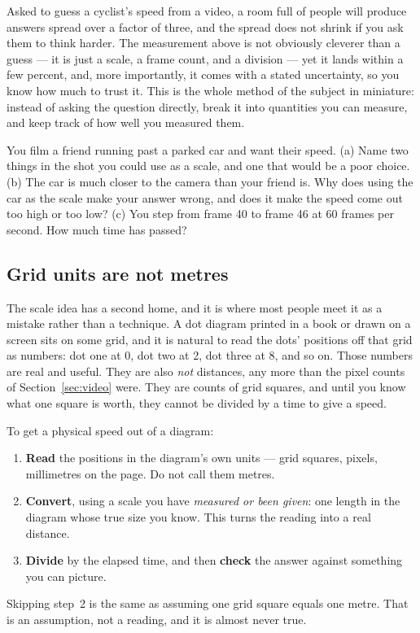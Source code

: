 \documentclass[11pt,twoside,openany]{book}
\newcounter{check}[chapter]
\begin{document}
\begin{modelnote}
Asked to guess a cyclist's speed from a video, a room full of people will produce answers spread over a factor of three, and the spread does not shrink if you ask them to think harder. The measurement above is not obviously cleverer than a guess --- it is just a scale, a frame count, and a division --- yet it lands within a few percent, and, more importantly, it comes with a stated uncertainty, so you know how much to trust it. This is the whole method of the subject in miniature: instead of asking the question directly, break it into quantities you can measure, and keep track of how well you measured them.
\end{modelnote}

\begin{checkbox}
You film a friend running past a parked car and want their speed. (a) Name two things in the shot you could use as a scale, and one that would be a poor choice. (b) The car is much closer to the camera than your friend is. Why does using the car as the scale make your answer wrong, and does it make the speed come out too high or too low? (c) You step from frame \num{40} to frame \num{46} at \num{60} frames per second. How much time has passed?
\end{checkbox}

\subsection{Grid units are not metres}
\label{sec:gridunits}

The scale idea has a second home, and it is where most people meet it as a mistake rather than a technique. A dot diagram printed in a book or drawn on a screen sits on some grid, and it is natural to read the dots' positions off that grid as numbers: dot one at \num{0}, dot two at \num{2}, dot three at \num{8}, and so on. Those numbers are real and useful. They are also \emph{not} distances, any more than the pixel counts of Section~\ref{sec:video} were. They are counts of grid squares, and until you know what one square is worth, they cannot be divided by a time to give a speed.

\begin{keyidea}
To get a physical speed out of a diagram:
\begin{enumerate}[itemsep=1pt,topsep=2pt]
  \item \textbf{Read} the positions in the diagram's own units --- grid squares, pixels, millimetres on the page. Do not call them metres.
  \item \textbf{Convert}, using a scale you have \emph{measured or been given}: one length in the diagram whose true size you know. This turns the reading into a real distance.
  \item \textbf{Divide} by the elapsed time, and then \textbf{check} the answer against something you can picture.
\end{enumerate}
Skipping step~2 is the same as assuming one grid square equals one metre. That is an assumption, not a reading, and it is almost never true.
\end{keyidea}
\end{document}
